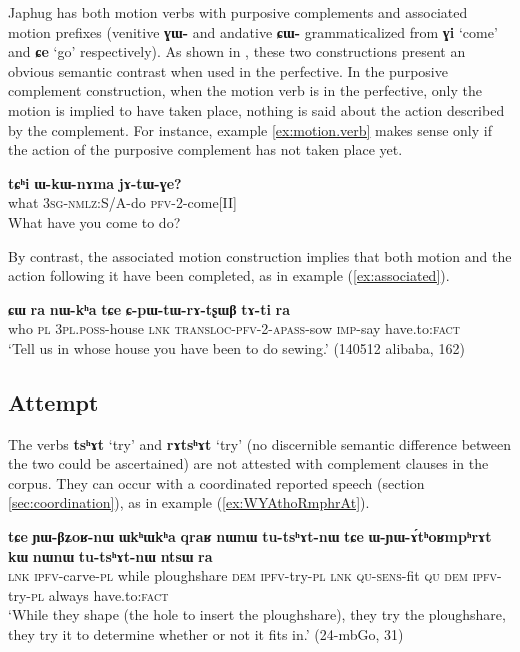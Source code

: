 \documentclass[oneside,a4paper,11pt]{article}
\newcommand{\ipa}[1]{\textbf{\phon#1}} %
\newcommand{\jpg}[2]{\ipa{#1} `#2'} %
\newcommand{\refb}[1]{(\ref{#1})}
\begin{document}
Japhug has both motion verbs with purposive complements and associated motion  prefixes (venitive \ipa{ɣɯ-}  and andative \ipa{ɕɯ-} grammaticalized from \jpg{ɣi}{come} and  \jpg{ɕe}{go} respectively). As shown in \citet[203]{jacques13harmonization}, these two constructions present an obvious semantic contrast when used in the perfective. In the purposive complement construction, when the motion verb is in the perfective, only the motion is implied to have taken place, nothing is said about the action described by the  complement. For instance, example \ref{ex:motion.verb} makes sense only if the action of the purposive complement has not taken place yet.

\begin{exe}
\ex \label{ex:motion.verb}
\gll
\ipa{tɕʰi} 	\ipa{ɯ-kɯ-nɤma} 	\ipa{jɤ-tɯ-ɣe?} \\
what \textsc{3sg-nmlz:}S/A-do \textsc{pfv-2}-come[II] \\
\glt What have you come to do?
\end{exe} 

By contrast, the associated motion construction implies that both motion and the action following it have been completed, as in example \refb{ex:associated}.

\begin{exe}
\ex \label{ex:associated}
\gll
\ipa{ɕɯ} 	\ipa{ra} 	\ipa{nɯ-kʰa} 	\ipa{tɕe} 	\ipa{ɕ-pɯ-tɯ-rɤ-tʂɯβ} \ipa{tɤ-ti} \ipa{ra}\\
who \textsc{pl} \textsc{3pl.poss}-house \textsc{lnk} \textsc{transloc-pfv-2-apass}-sow \textsc{imp}-say  have.to:\textsc{fact} \\
\glt `Tell us in whose house you have been to do sewing.' (140512 alibaba, 162)
 \end{exe} 

\subsection{Attempt} \label{sec:attempt}
The verbs \jpg{tsʰɤt}{try} and \jpg{rɤtsʰɤt}{try} (no discernible semantic difference between the two could be ascertained) are not attested with complement clauses in the corpus. They can occur with a coordinated reported speech (section \ref{sec:coordination}), as in example \refb{ex:WYAthoRmphrAt}.
 
\begin{exe}
\ex \label{ex:WYAthoRmphrAt}
\gll \ipa{tɕe} 	\ipa{ɲɯ-βʑoʁ-nɯ} 	\ipa{ɯkʰɯkʰa} 	\ipa{qraʁ} 	\ipa{nɯnɯ} 	\ipa{tu-tsʰɤt-nɯ} 	\ipa{tɕe} 	\ipa{ɯ-ɲɯ-ɤ́tʰoʁmpʰrɤt} 	\ipa{kɯ} 	\ipa{nɯnɯ} 	\ipa{tu-tsʰɤt-nɯ} 	\ipa{ntsɯ} 	\ipa{ra}   	 \\
\textsc{lnk} \textsc{ipfv}-carve-\textsc{pl} while ploughshare \textsc{dem} \textsc{ipfv}-try-\textsc{pl} \textsc{lnk} \textsc{qu-sens}-fit \textsc{qu} \textsc{dem} \textsc{ipfv}-try-\textsc{pl} always have.to:\textsc{fact} \\
 \glt `While they shape (the hole to insert the ploughshare), they try the ploughshare, they try it to determine whether or not it fits in.' (24-mbGo, 31)
\end{exe}
\end{document}
